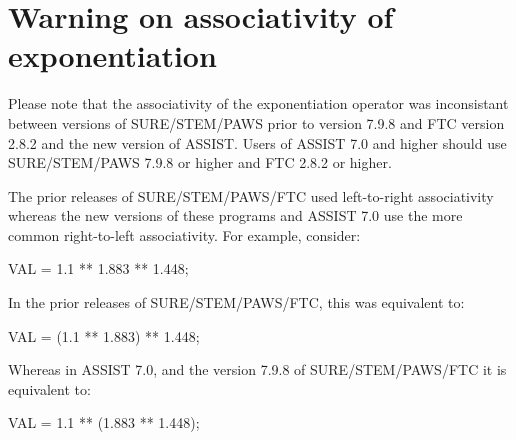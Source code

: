\section{Warning on associativity of exponentiation}

Please note that the associativity of the exponentiation operator was
inconsistant between versions of SURE/STEM/PAWS prior to version 7.9.8 and
FTC version 2.8.2 and the new version of ASSIST.   Users of ASSIST 7.0
and higher should use SURE/STEM/PAWS 7.9.8 or higher and FTC 2.8.2 or
higher.

The prior releases of SURE/STEM/PAWS/FTC used left-to-right
associativity whereas the new versions of these programs and ASSIST 7.0 use
the more common right-to-left associativity.   For example, consider:
\begin{seta}
    VAL = 1.1 ** 1.883 ** 1.448;
\end{seta}
In the prior releases of SURE/STEM/PAWS/FTC, this was equivalent to:
\begin{seta}
    VAL = (1.1 ** 1.883) ** 1.448;
\end{seta}
Whereas in ASSIST 7.0, and the version 7.9.8 of SURE/STEM/PAWS/FTC it
is equivalent to:
\begin{seta}
    VAL = 1.1 ** (1.883 ** 1.448);
\end{seta}

